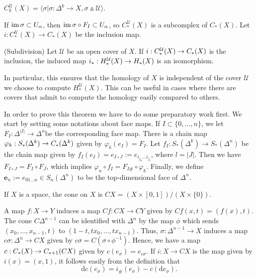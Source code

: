 \documentclass[a4paper,11pt]{article}
\begin{document}
				\begin{defi}
					$C_{k}^{\mathcal{U}}(X)=\langle \sigma|\sigma:\Delta^k\rightarrow X,\sigma\vartriangle \mathcal{U}\rangle$.	
				\end{defi}

				If $\im\sigma\subset U_\alpha$, then $\im\sigma\circ F_I\subset U_\alpha$, so $C_\ast^\mathcal{U}(X)$ is a subcomplex of $C_\ast(X)$. Let $i:C_\ast^\mathcal{U}(X)\rightarrow C_\ast(X)$ be the inclusion map.

				\begin{thm}(Subdivision)\label{thm--subdivision}
					Let $\mathcal{U}$ be an open cover of $X$. If $i:C_\ast^\mathcal{U}(X)\rightarrow \cx{X}$ is the inclusion, the induced map $i_\ast:H_\ast^\mathcal{U}(X)\rightarrow \hg{X}$ is an isomorphism.
				\end{thm}

				In particular, this ensures that the homology of $X$ is independent of the cover $\mathcal{U}$ we choose to compute $H_\ast^\mathcal{U}(X)$. This can be useful in cases where there are covers that admit to compute the homology easily compared to others.

				In order to prove this theorem we have to do some preparatory work first. We start by setting some notations about face maps. If $I\subset\{0,\dots,n\}$, we let $F_I:\Delta^{|I|}\rightarrow \Delta^n$be the corresponding face map. There is a chain map $\varphi_k:S_\ast(\Delta^k)\rightarrow \cx{\Delta^k}$ given by $\varphi_k(e_I)=F_I$. Let $f_I:S_\ast(\Delta^k)\rightarrow S_\ast(\Delta^n)$ be the chain map given by $f_I(e_I)=e_{I\circ J}:=e_{i_{j_0}\dots i_{j_l}}$, where $l=|J|$. Then we have $F_{I\circ J}=F_I\circ F_J$, which implies $\varphi_n\circ f_I=F_{I\#}\circ\varphi_k$. Finally, we define $\textbf{e}_n:=e_{01\dots n}\in S_n(\Delta^n)$ to be the top-dimensional face of $\Delta^n$.
				
				\begin{defi}
					If $X$ is a space, the cone on $X$ is $CX=(X\times[0,1])/(X\times\{0\})$.
				\end{defi}

				A map $f:X\rightarrow Y$ induces a map $Cf:CX\rightarrow CY$ given by $Cf(x,t)=(f(x),t)$. The cone $C\Delta^{n-1}$ can be identified with $\Delta^n$ by the map $\phi$ which sends $(x_0,\dots,x_{n-1},t)$ to $(1-t,tx_0,\dots,tx_{n-1})$. Thus, $\sigma:\Delta^{n-1}\rightarrow X$ induces a map $c\sigma:\Delta^n\rightarrow CX$ given by $c\sigma=C(\sigma\circ\phi^{-1})$. Hence, we have a map $c:\cx{X}\rightarrow \cx[\ast+1]{CX}$ given by $c(e_\sigma)=e_{c\sigma}$. If $i:X\rightarrow CX$ is the map given by $i(x)=(x,1)$, it follows easily from the definition that
				\begin{equation*}
					\mathrm{d}c(e_\sigma)=i_\#(e_\sigma)-c(\mathrm{d}e_\sigma).
				\end{equation*}
				
\end{document}
